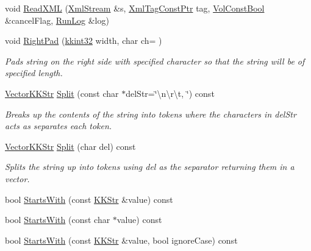 \begin{DoxyCompactItemize}
void \hyperlink{class_k_k_b_1_1_k_k_str_ae1a96f0df0ef047328a81d35f408ce91}{Read\+X\+ML} (\hyperlink{class_k_k_b_1_1_xml_stream}{Xml\+Stream} \&s, \hyperlink{namespace_k_k_b_a5f1b0b1667d79fec26deeff10c43df23}{Xml\+Tag\+Const\+Ptr} tag, \hyperlink{namespace_k_k_b_a7d390f568e2831fb76b86b56c87bf92f}{Vol\+Const\+Bool} \&cancel\+Flag, \hyperlink{class_k_k_b_1_1_run_log}{Run\+Log} \&log)
\item 
void \hyperlink{class_k_k_b_1_1_k_k_str_aab728b1075242a5728ec4a579979d519}{Right\+Pad} (\hyperlink{namespace_k_k_b_a8fa4952cc84fda1de4bec1fbdd8d5b1b}{kkint32} width, char ch= \textquotesingle{} \textquotesingle{})
\begin{DoxyCompactList}\small\item\em Pads string on the right side with specified character so that the string will be of specified length. \end{DoxyCompactList}\item 
\hyperlink{class_k_k_b_1_1_vector_k_k_str}{Vector\+K\+K\+Str} \hyperlink{class_k_k_b_1_1_k_k_str_ac06a219a8773d97383baef7cb10ab091}{Split} (const char $\ast$del\+Str=\char`\"{}\textbackslash{}n\textbackslash{}r\textbackslash{}t, \char`\"{}) const 
\begin{DoxyCompactList}\small\item\em Breaks up the contents of the string into tokens where the characters in \textquotesingle{}del\+Str\textquotesingle{} acts as separates each token. \end{DoxyCompactList}\item 
\hyperlink{class_k_k_b_1_1_vector_k_k_str}{Vector\+K\+K\+Str} \hyperlink{class_k_k_b_1_1_k_k_str_ab0f49e9e7d17a6b9e08cae00d7e0a25c}{Split} (char del) const 
\begin{DoxyCompactList}\small\item\em Splits the string up into tokens using \textquotesingle{}del\textquotesingle{} as the separator returning them in a vector. \end{DoxyCompactList}\item 
bool \hyperlink{class_k_k_b_1_1_k_k_str_a7026d727e15a0e9300b6ba68252accb0}{Starts\+With} (const \hyperlink{class_k_k_b_1_1_k_k_str}{K\+K\+Str} \&value) const 
\item 
bool \hyperlink{class_k_k_b_1_1_k_k_str_af4da2c54bbe45fa88b899fb5d47eb479}{Starts\+With} (const char $\ast$value) const 
\item 
bool \hyperlink{class_k_k_b_1_1_k_k_str_a45f35928f7a558c14477a85b3f4fa95e}{Starts\+With} (const \hyperlink{class_k_k_b_1_1_k_k_str}{K\+K\+Str} \&value, bool ignore\+Case) const 

\end{DoxyCompactItemize}
